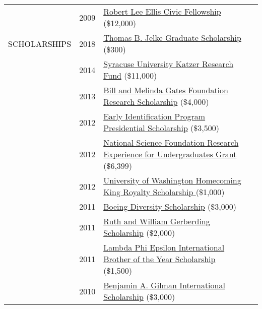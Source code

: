 \documentclass[12pt]{article}
\begin{document}
{{\begin{longtable}{Rp{1.0in}p{0.25in}p{4.75in}}
& \footnotesize{2009} & \href{http://www.washington.edu/carlson/ellis-civic-fellowship/}{{Robert Lee Ellis Civic Fellowship}} (\$12,000) \\

\textcolor{black}{\footnotesize{\uppercase{Scholarships}}} & \footnotesize{2018} & \href{https://www.afa1976.org/foundation}{{Thomas B. Jelke Graduate Scholarship}} (\$300) \\

& \footnotesize{2014} & \href{https://youtu.be/kFmO44rs3-c}{{Syracuse University Katzer Research Fund}} (\$11,000) \\

& \footnotesize{2013} & \href{https://expo.uw.edu/public/offering/271}{{Bill and Melinda Gates Foundation Research Scholarship}} (\$4,000) \\

& \footnotesize{2012} & \href{http://depts.washington.edu/eip/}{{Early Identification Program Presidential Scholarship}} (\$3,500) \\

& \footnotesize{2012} & \href{http://www.nsf.gov/crssprgm/reu/}{{National Science Foundation Research Experience for Undergraduates Grant}} (\$6,399) \\

& \footnotesize{2012} & \href{http://www.washington.edu/uaa/2013/06/28/oh-the-places-theyll-go-new-grads-and-their-plans/bryan-dosono/}{{University of Washington Homecoming King Royalty Scholarship }}(\$1,000) \\

& \footnotesize{2011} & \href{https://ischool.uw.edu/news/2012/04/bryan-dosono-informatics-student-speaks-boeing-scholarship-breakfast}{{Boeing Diversity Scholarship}} (\$3,000) \\

& \footnotesize{2011} & \href{http://www.washington.edu/omad/2011/05/17/assunta-ng-student-scholars-honored-at-41st-annual-eop-celebration/}{{Ruth and William Gerberding Scholarship}} (\$2,000) \\

& \footnotesize{2011} & \href{http://lambdaphiepsilon.com/resources/\#academicachievement}{{Lambda Phi Epsilon International Brother of the Year Scholarship}} (\$1,500) \\

& \footnotesize{2010} & \href{http://depts.washington.edu/uwhonors/news/brief/?id=61}{{Benjamin A. Gilman International Scholarship}} (\$3,000) \\


\end{longtable}}}
\end{document}
